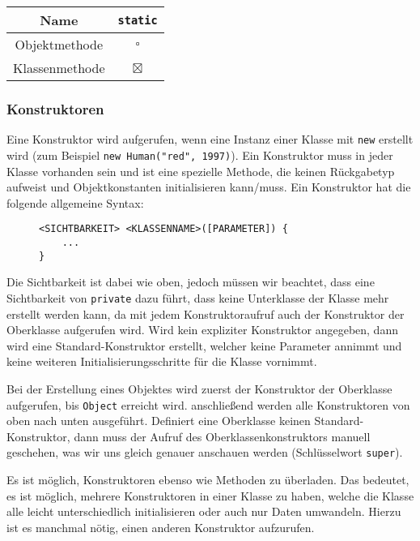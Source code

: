 		\begin{table}[H]
			\centering
			\begin{tabular}{c | c}
				\textbf{Name}  & \lstinline|static| \\ \hline
				Objektmethode  & \(\square\)        \\
				Klassenmethode & \(\boxtimes\)
			\end{tabular}
		\end{table}
	
	\subsubsection{Konstruktoren}
		\label{sec:constructor}
	
		Eine Konstruktor wird aufgerufen, wenn eine Instanz einer Klasse mit \lstinline|new| erstellt wird (zum Beispiel \lstinline|new Human("red", 1997)|). Ein Konstruktor muss in jeder Klasse vorhanden sein und ist eine spezielle Methode, die keinen Rückgabetyp aufweist und Objektkonstanten initialisieren kann/muss. Ein Konstruktor hat die folgende allgemeine Syntax:
		\begin{figure}[H]
			\centering
			\begin{lstlisting}
<SICHTBARKEIT> <KLASSENNAME>([PARAMETER]) {
	...
}
\end{lstlisting}
		\end{figure}
		Die Sichtbarkeit ist dabei wie oben, jedoch müssen wir beachtet, dass eine Sichtbarkeit von \lstinline|private| dazu führt, dass keine Unterklasse der Klasse mehr erstellt werden kann, da mit jedem Konstruktoraufruf auch der Konstruktor der Oberklasse aufgerufen wird. Wird kein expliziter Konstruktor angegeben, dann wird eine Standard-Konstruktor erstellt, welcher keine Parameter annimmt und keine weiteren Initialisierungsschritte für die Klasse vornimmt.
		
		Bei der Erstellung eines Objektes wird zuerst der Konstruktor der Oberklasse aufgerufen, bis \lstinline|Object| erreicht wird. anschließend werden alle Konstruktoren von oben nach unten ausgeführt. Definiert eine Oberklasse keinen Standard-Konstruktor, dann muss der Aufruf des Oberklassenkonstruktors manuell geschehen, was wir uns gleich genauer anschauen werden (Schlüsselwort \lstinline|super|).
		
		Es ist möglich, Konstruktoren ebenso wie Methoden zu überladen. Das bedeutet, es ist möglich, mehrere Konstruktoren in einer Klasse zu haben, welche die Klasse alle leicht unterschiedlich initialisieren oder auch nur Daten umwandeln. Hierzu ist es manchmal nötig, einen anderen Konstruktor aufzurufen.
		
